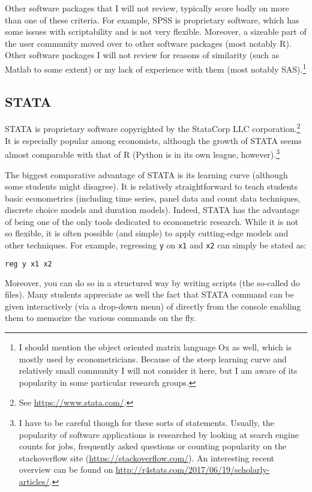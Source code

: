 \documentclass[fleqn,10pt]{SelfArx} %
\begin{document}
Other software packages that I will not review, typically score badly on more than one of these criteria. For example, SPSS is proprietary software, which has some issues with scriptability and is not very flexible. Moreover, a sizeable part of the user community moved over to other software packages (most notably R). Other software packages I will not review for reasons of similarity (such as Matlab to some extent) or my lack of experience with them (most notably SAS).\footnote{I should mention the object oriented matrix language Ox as well, which is mostly used by econometricians. Because of the steep learning curve and relatively small community I will not consider it here, but I am aware of its popularity in some particular research groups.}

\subsection*{STATA}

STATA is proprietary software copyrighted by the StataCorp LLC corporation.\footnote{See \href{https://www.stata.com}{https://www.stata.com/}.} It is especially popular among economists, although the growth of STATA seems almost comparable with that of R (Python is in its own league, however).\footnote{I have to be careful though for these sorts of statements. Usually, the popularity of software applications is researched by looking at search engine counts for jobs, frequently asked questions or counting popularity on the stackoverflow site (\href{https://stackoverflow.com/}{https://stackoverflow.com/}). An interesting recent overview can be found on \href{http://r4stats.com/2017/06/19/scholarly-articles/}{http://r4stats.com/2017/06/19/scholarly-articles/}.}

The biggest comparative advantage of STATA is its learning curve (although some students might disagree). It is relatively straightforward to teach students basic econometrics (including time series, panel data and count data techniques, discrete choice models and duration models). Indeed, STATA has the advantage of being one of the only tools dedicated to econometric research. While it is not so flexible, it is often possible (and simple) to apply cutting-edge models and other techniques. For example, regressing \texttt{y} on \texttt{x1} and \texttt{x2} can simply be stated as:
\begin{lstlisting}[language=R]
reg y x1 x2
\end{lstlisting}
Moreover, you can do so in a structured way by writing scripts (the so-called do files). Many students appreciate as well the fact that STATA command can be given interactively (via a drop-down menu) of directly from the console enabling them to memorize the various commands on the fly. 
\end{document}
